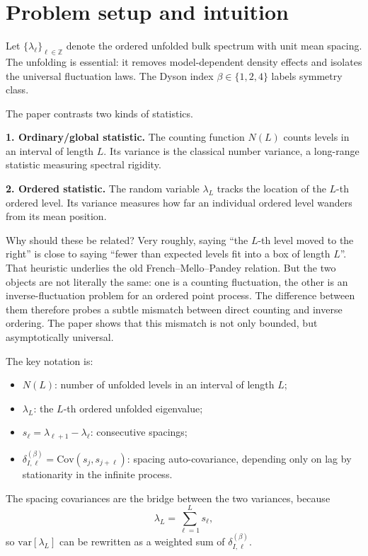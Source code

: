 \documentclass[11pt]{article}
\begin{document}
\section*{Problem setup and intuition}
Let $\{\lambda_\ell\}_{\ell\in\mathbb Z}$ denote the ordered unfolded bulk spectrum with unit mean spacing. The unfolding is essential: it removes model-dependent density effects and isolates the universal fluctuation laws. The Dyson index $\beta\in\{1,2,4\}$ labels symmetry class.

The paper contrasts two kinds of statistics.

\textbf{1. Ordinary/global statistic.} The counting function $N(L)$ counts levels in an interval of length $L$. Its variance is the classical number variance, a long-range statistic measuring spectral rigidity.

\textbf{2. Ordered statistic.} The random variable $\lambda_L$ tracks the location of the $L$-th ordered level. Its variance measures how far an individual ordered level wanders from its mean position.

Why should these be related? Very roughly, saying ``the $L$-th level moved to the right'' is close to saying ``fewer than expected levels fit into a box of length $L$''. That heuristic underlies the old French--Mello--Pandey relation. But the two objects are not literally the same: one is a counting fluctuation, the other is an inverse-fluctuation problem for an ordered point process. The difference between them therefore probes a subtle mismatch between direct counting and inverse ordering. The paper shows that this mismatch is not only bounded, but asymptotically universal.

The key notation is:
\begin{itemize}
\item $N(L)$: number of unfolded levels in an interval of length $L$;
\item $\lambda_L$: the $L$-th ordered unfolded eigenvalue;
\item $s_\ell=\lambda_{\ell+1}-\lambda_\ell$: consecutive spacings;
\item $\delta^{(\beta)}_{I,\ell}=\mathrm{Cov}(s_j,s_{j+\ell})$: spacing auto-covariance, depending only on lag by stationarity in the infinite process.
\end{itemize}

The spacing covariances are the bridge between the two variances, because
\[
\lambda_L=\sum_{\ell=1}^{L} s_\ell,
\]
so $\mathrm{var}[\lambda_L]$ can be rewritten as a weighted sum of $\delta^{(\beta)}_{I,\ell}$.
\end{document}
